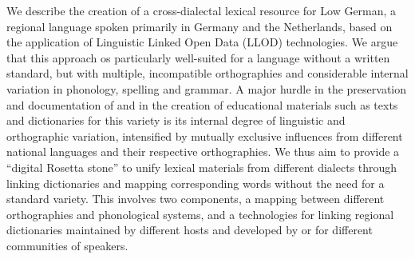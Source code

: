 We describe the creation of a cross-dialectal lexical resource for Low German, a regional language spoken primarily in Germany and the Netherlands, based on the application of Linguistic Linked Open Data (LLOD) technologies. We argue that this approach os particularly well-suited for a language without a written standard, but with multiple, incompatible orthographies and considerable internal variation in phonology, spelling and grammar. A major hurdle in the preservation and documentation of and in the creation of educational materials such as texts and dictionaries for this variety is its internal degree of linguistic and orthographic variation, intensified by mutually exclusive influences from different national languages and their respective orthographies.%
We thus aim to provide a ``digital Rosetta stone'' to unify lexical materials from different dialects through linking dictionaries and mapping corresponding words without the need for a standard variety. This involves two components, a mapping between different orthographies and phonological systems, and a technologies for linking regional dictionaries maintained by different hosts and developed by or for different communities of speakers.
